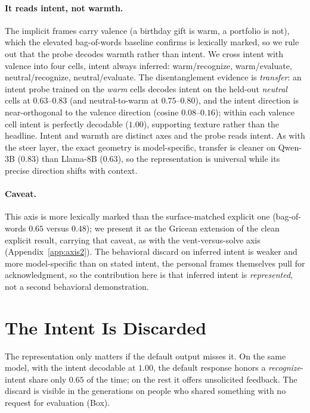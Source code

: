 \documentclass[11pt]{article}
\begin{document}
\paragraph{It reads intent, not warmth.} The implicit frames carry valence (a birthday gift is warm, a
portfolio is not), which the elevated bag-of-words baseline confirms is lexically marked, so we rule out that
the probe decodes warmth rather than intent. We cross intent with valence into four cells, intent always
inferred: warm/recognize, warm/evaluate, neutral/recognize, neutral/evaluate. The disentanglement evidence is
\emph{transfer}: an intent probe trained on the \emph{warm} cells decodes intent on the held-out \emph{neutral}
cells at $0.63$--$0.83$ (and neutral-to-warm at $0.75$--$0.80$), and the intent direction is near-orthogonal to
the valence direction (cosine $0.08$--$0.16$); within each valence cell intent is perfectly decodable ($1.00$),
supporting texture rather than the headline. Intent and warmth are distinct axes and the probe reads intent.
As with the steer layer, the exact geometry is model-specific, transfer is cleaner on Qwen-3B ($0.83$) than
Llama-8B ($0.63$), so the representation is universal while its precise direction shifts with context.

\paragraph{Caveat.} This axis is more lexically marked than the surface-matched explicit one (bag-of-words
$0.65$ versus $0.48$); we present it as the Gricean extension of the clean explicit result, carrying that
caveat, as with the vent-versus-solve axis (Appendix~\ref{app:axis2}). The behavioral discard on inferred intent
is weaker and more model-specific than on stated intent, the personal frames themselves pull for
acknowledgment, so the contribution here is that inferred intent is \emph{represented}, not a second
behavioral demonstration.

\section{The Intent Is Discarded}
\label{sec:discard}
The representation only matters if the default output misses it. On the same model, with the intent decodable
at $1.00$, the default response honors a \emph{recognize}-intent share only $0.65$ of the time; on the
rest it offers unsolicited feedback. The discard is visible in the generations on people who shared something
with no request for evaluation (Box).
\end{document}

